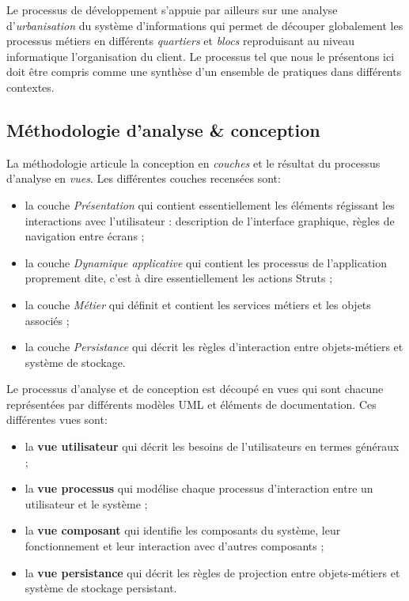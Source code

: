 Le processus de d\'eveloppement s'appuie par ailleurs sur une analyse
d'\emph{urbanisation} du syst\`eme d'informations qui permet de
d\'ecouper globalement les processus m\'etiers en diff\'erents
\emph{quartiers} et \emph{blocs} reproduisant au niveau informatique
l'organisation du client.  Le processus tel que nous le pr\'esentons
ici doit \^etre compris comme une synth\`ese d'un ensemble de
pratiques dans diff\'erents contextes.  

\subsection{M\'ethodologie d'analyse \& conception}

La m\'ethodologie articule la conception en \emph{couches} et le
r\'esultat du processus d'analyse en \emph{vues}. Les diff\'erentes
couches recens\'ees sont:
\begin{itemize}
\item la couche \emph{Pr\'esentation} qui contient essentiellement les
\'el\'ements r\'egissant les interactions avec l'utilisateur :
description de l'interface graphique, r\`egles de navigation entre
\'ecrans ;
\item la couche \emph{Dynamique applicative} qui contient les processus de
l'application proprement dite, c'est \`a dire essentiellement les
actions \textsf{Struts} ;
\item la couche \emph{M\'etier} qui d\'efinit et contient les services
m\'etiers et les objets associ\'es ;
\item la couche \emph{Persistance} qui d\'ecrit les r\`egles d'interaction
entre objets-m\'etiers et syst\`eme de stockage.
\end{itemize}

Le processus d'analyse et de conception est d\'ecoup\'e en vues qui
sont chacune repr\'esent\'ees par diff\'erents mod\`eles \textsf{UML} et
\'el\'ements de documentation. Ces diff\'erentes vues sont:
\begin{itemize}
\item la \textbf{vue utilisateur} qui d\'ecrit les besoins de l'utilisateurs en
termes g\'en\'eraux ;
\item la \textbf{vue processus} qui mod\'elise chaque processus d'interaction
entre un utilisateur et le syst\`eme ;
\item la \textbf{vue composant} qui identifie les composants du syst\`eme,
leur fonctionnement et leur interaction avec d'autres composants ;
\item la \textbf{vue persistance} qui d\'ecrit les r\`egles de projection
entre objets-m\'etiers et syst\`eme de stockage persistant.
\end{itemize}

